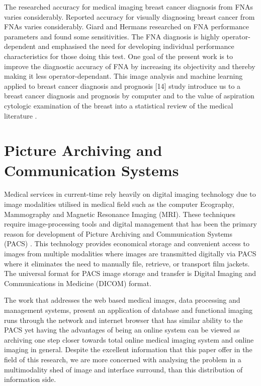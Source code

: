\clearpage

The researched accuracy for medical imaging breast cancer diagnosis from FNAs varies considerably. Reported accuracy for visually diagnosing breast cancer from FNAs varies considerably. Giard and Hermans \cite{Robertson04scalablefabric:} researched on FNA performance parameters and found some sensitivities. The FNA diagnosis is highly operator-dependent and emphasised the need for developing individual performance characteristics for those doing this test. One goal of the present work is to improve the diagnostic accuracy of FNA by increasing its objectivity and thereby making it less operator-dependant. This image analysis and machine learning applied to breast cancer diagnosis and prognosis [14] study introduce us to a breast cancer diagnosis and prognosis by computer and to the value of aspiration cytologic examination of the breast into a statistical review of the medical literature \cite{Robertson04scalablefabric:}.

\section{Picture Archiving and Communication Systems}

Medical services in current-time rely heavily on digital imaging technology due to image modalities utilised in medical field such as the computer Ecography, Mammography and Magnetic Resonance Imaging (MRI). These techniques require image-processing tools and digital management that has been the primary reason for development of Picture Archiving and Communication Systems (PACS) \cite{oosterwijk2004pacs}. This technology provides economical storage and convenient access to images from multiple modalities where images are transmitted digitally via PACS where it eliminates the need to manually file, retrieve, or transport film jackets. The universal format for PACS image storage and transfer is Digital Imaging and Communications in Medicine (DICOM) \cite{mustra2008overview} format.

The work that addresses the web based medical images, data processing and management systems, present an application of database and functional imaging \cite{kim2000web} runs through the network and internet browser that has similar ability to the PACS yet having the advantages of being an online system can be viewed as archiving one step closer towards total online medical imaging system and online imaging in general. Despite the excellent information that this paper offer in the field of this research, we are more concerned with analysing the problem in a multimodality shed of image and interface surround, than this distribution of information side.


